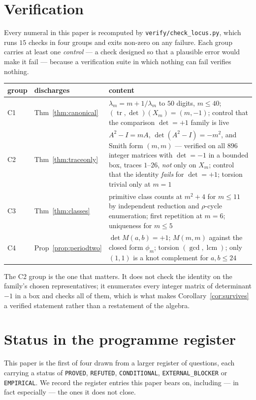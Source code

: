 \documentclass[11pt,a4paper]{article}
\theoremstyle{definition}
\theoremstyle{remark}
\newcommand{\tr}{\operatorname{tr}}
\newcommand{\lcm}{\operatorname{lcm}}
\begin{document}
\section{Verification}\label{app:verify}

Every numeral in this paper is recomputed by
\texttt{verify/check\_locus.py}, which runs $15$ checks in four groups and exits non-zero on
any failure. Each group carries at least one \emph{control} --- a check designed so that a
plausible error would make it fail --- because a verification suite in which nothing can fail
verifies nothing.

\begin{center}
\begin{tabular}{@{}llp{6.6cm}@{}}
\toprule
group & discharges & content \\
\midrule
C1 & Thm~\ref{thm:canonical}  & $\lambda_m=m+1/\lambda_m$ to $50$ digits, $m\le40$; $(\tr,\det)(X_m)=(m,-1)$; control that the comparison $\det=+1$ family is live \\
C2 & Thm~\ref{thm:traceonly}  & $A^2-I=mA$, $\det(A^2-I)=-m^2$, and Smith form $(m,m)$ --- verified on all $896$ integer matrices with $\det=-1$ in a bounded box, traces $1$--$26$, \emph{not} only on $X_m$; control that the identity \emph{fails} for $\det=+1$; torsion trivial only at $m=1$ \\
C3 & Thm~\ref{thm:classes}    & primitive class counts at $m^2+4$ for $m\le11$ by independent reduction and $\rho$-cycle enumeration; first repetition at $m=6$; uniqueness for $m\le5$ \\
C4 & Prop~\ref{prop:periodtwo}& $\det M(a,b)=+1$; $M(m,m)$ against the closed form $\phi_m$; torsion $(\gcd,\lcm)$; only $(1,1)$ is a knot complement for $a,b\le24$ \\
\bottomrule
\end{tabular}
\end{center}

The C2 group is the one that matters. It does not check the identity on the family's chosen
representatives; it enumerates every integer matrix of determinant $-1$ in a box and checks all
of them, which is what makes Corollary~\ref{cor:survives} a verified statement rather than a
restatement of the algebra.

\section{Status in the programme register}\label{app:register}

This paper is the first of four drawn from a larger register of questions, each carrying a
status of \texttt{PROVED}, \texttt{REFUTED}, \texttt{CONDITIONAL}, \texttt{EXTERNAL\_BLOCKER}
or \texttt{EMPIRICAL}. We record the register entries this paper bears on, including --- in
fact especially --- the ones it does not close.
\end{document}

